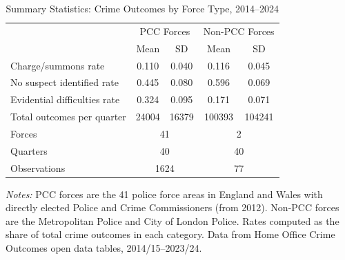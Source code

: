 \begin{table}[htbp]
\centering
\caption{Summary Statistics: Crime Outcomes by Force Type, 2014--2024}
\label{tab:summary}
\begin{tabular}{lcccc}
\hline\hline
 & \multicolumn{2}{c}{PCC Forces} & \multicolumn{2}{c}{Non-PCC Forces} \\
 & Mean & SD & Mean & SD \\
\hline
Charge/summons rate & 0.110 & 0.040 & 0.116 & 0.045 \\
No suspect identified rate & 0.445 & 0.080 & 0.596 & 0.069 \\
Evidential difficulties rate & 0.324 & 0.095 & 0.171 & 0.071 \\
Total outcomes per quarter & 24004 & 16379 & 100393 & 104241 \\
\hline
Forces & \multicolumn{2}{c}{41} & \multicolumn{2}{c}{2} \\
Quarters & \multicolumn{2}{c}{40} & \multicolumn{2}{c}{40} \\
Observations & \multicolumn{2}{c}{1624} & \multicolumn{2}{c}{77} \\
\hline\hline
\end{tabular}
\begin{tablenotes}[flushleft]
\item \textit{Notes:} PCC forces are the 41 police force areas in England and Wales with directly elected Police and Crime Commissioners (from 2012). Non-PCC forces are the Metropolitan Police and City of London Police. Rates computed as the share of total crime outcomes in each category. Data from Home Office Crime Outcomes open data tables, 2014/15--2023/24.
\end{tablenotes}
\end{table}

